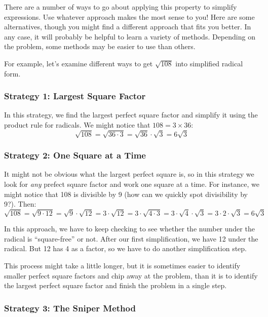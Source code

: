 There are a number of ways to go about applying this property to simplify expressions. Use whatever approach makes the most sense to you! Here are some alternatives, though you might find a different approach that fits you better. In any case, it will probably be helpful to learn a variety of methods. Depending on the problem, some methods may be easier to use than others.

For example, let's examine different ways to get $\sqrt{108}$ into simplified radical form.

\subsubsection{Strategy 1: Largest Square Factor}

In this strategy, we find the largest perfect square factor and simplify it using the product rule for radicals. We might notice that $108 = 3 \times 36$: \[\sqrt{108} = \sqrt{36 \cdot 3} = \sqrt{36} \cdot \sqrt{3} = 6\sqrt{3}\]

\subsubsection{Strategy 2: One Square at a Time}

It might not be obvious what the largest perfect square is, so in this strategy we look for \textit{any} prefect square factor and work one square at a time. For instance, we might notice that 108 is divisible by 9 (how can we quickly spot divisibility by 9?). Then: \[\sqrt{108} = \sqrt{9 \cdot 12} = \sqrt{9} \cdot \sqrt{12} = 3 \cdot \sqrt{12} = 3 \cdot \sqrt{4 \cdot 3} = 3 \cdot \sqrt{4} \cdot \sqrt{3} = 3 \cdot 2 \cdot \sqrt{3} = 6\sqrt{3}\]

In this approach, we have to keep checking to see whether the number under the radical is ``square-free'' or not. After our first simplification, we have 12 under the radical. But 12 has 4 as a factor, so we have to do another simplification step.

This process might take a little longer, but it is sometimes easier to identify smaller perfect square factors and chip away at the problem, than it is to identify the largest perfect square factor and finish the problem in a single step.

\subsubsection{Strategy 3: The Sniper Method}

